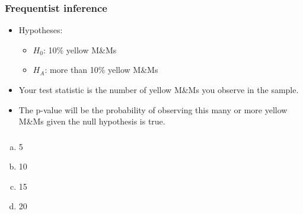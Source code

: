 \documentclass[11pt,containsverbatim,handout,xcolor=xelatex,dvipsnames,table]{beamer}
\begin{document}
\begin{frame}
\frametitle{Frequentist inference}

\begin{itemize}

\item Hypotheses:
\begin{itemize}
\item $H_0$: 10\% yellow M\&Ms
\item $H_A$: more than 10\% yellow M\&Ms 
\end{itemize}

\item Your test statistic is the number of yellow M\&Ms you observe in the sample. 

\item The p-value will be the probability of observing this many or more yellow M\&Ms given the null hypothesis is true.

\end{itemize}

\end{frame}


\begin{frame}
\frametitle{}


\begin{multicols}{4}
\begin{enumerate}[(a)]
\item 5
\item 10
\item 15
\item 20
\end{enumerate}
\end{multicols}


\end{frame}

\end{document}
